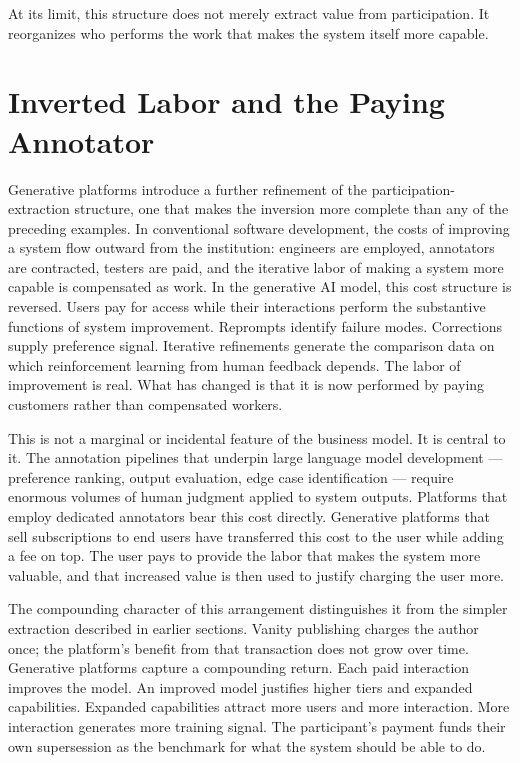 \documentclass[12pt, a4paper]{article}
\begin{document}
At its limit, this structure does not merely extract value from participation. It reorganizes who performs the work that makes the system itself more capable.

\section{Inverted Labor and the Paying Annotator}

Generative platforms introduce a further refinement of the participation-extraction structure, one that makes the inversion more complete than any of the preceding examples. In conventional software development, the costs of improving a system flow outward from the institution: engineers are employed, annotators are contracted, testers are paid, and the iterative labor of making a system more capable is compensated as work. In the generative AI model, this cost structure is reversed. Users pay for access while their interactions perform the substantive functions of system improvement. Reprompts identify failure modes. Corrections supply preference signal. Iterative refinements generate the comparison data on which reinforcement learning from human feedback depends. The labor of improvement is real. What has changed is that it is now performed by paying customers rather than compensated workers.

This is not a marginal or incidental feature of the business model. It is central to it. The annotation pipelines that underpin large language model development — preference ranking, output evaluation, edge case identification — require enormous volumes of human judgment applied to system outputs. Platforms that employ dedicated annotators bear this cost directly. Generative platforms that sell subscriptions to end users have transferred this cost to the user while adding a fee on top. The user pays to provide the labor that makes the system more valuable, and that increased value is then used to justify charging the user more.

The compounding character of this arrangement distinguishes it from the simpler extraction described in earlier sections. Vanity publishing charges the author once; the platform's benefit from that transaction does not grow over time. Generative platforms capture a compounding return. Each paid interaction improves the model. An improved model justifies higher tiers and expanded capabilities. Expanded capabilities attract more users and more interaction. More interaction generates more training signal. The participant's payment funds their own supersession as the benchmark for what the system should be able to do.
\end{document}
